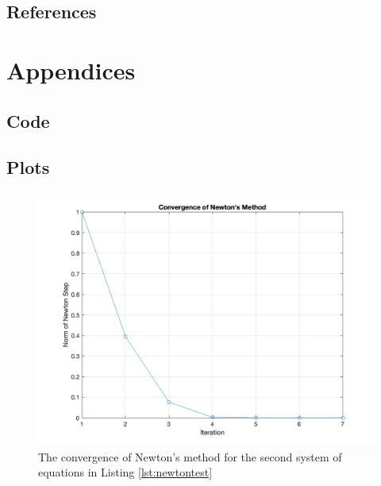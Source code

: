 \documentclass[11pt]{article}
\begin{document}
\subsection{References}

\section{Appendices}

\subsection{Code}





\subsection{Plots}

\begin{figure}[h]
  \centering
  \includegraphics[width=\textwidth]{newtonplot.png}
  \caption{The convergence of Newton's method for the second system of equations in Listing \ref{lst:newtontest}}
  \label{fig:newtonplot}
\end{figure}
\end{document}
